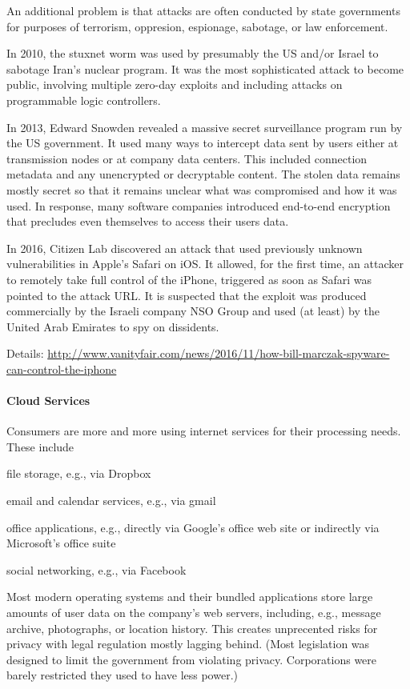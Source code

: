 An additional problem is that attacks are often conducted by state governments for purposes of terrorism, oppresion, espionage, sabotage, or law enforcement.

In 2010, the stuxnet worm was used by presumably the US and/or Israel to sabotage Iran's nuclear program.
It was the most sophisticated attack to become public, involving multiple zero-day exploits and including attacks on programmable logic controllers.

In 2013, Edward Snowden revealed a massive secret surveillance program run by the US government.
It used many ways to intercept data sent by users either at transmission nodes or at company data centers.
This included connection metadata and any unencrypted or decryptable content.
The stolen data remains mostly secret so that it remains unclear what was compromised and how it was used.
In response, many software companies introduced end-to-end encryption that precludes even themselves to access their users data.

In 2016, Citizen Lab discovered an attack that used previously unknown vulnerabilities in Apple's Safari on iOS.
It allowed, for the first time, an attacker to remotely take full control of the iPhone, triggered as soon as Safari was pointed to the attack URL.
It is suspected that the exploit was produced commercially by the Israeli company NSO Group and used (at least) by the United Arab Emirates to spy on dissidents.

Details: \url{http://www.vanityfair.com/news/2016/11/how-bill-marczak-spyware-can-control-the-iphone}

\paragraph{Cloud Services}
Consumers are more and more using internet services for their processing needs.
These include
\begin{compactitem}
\item file storage, e.g., via Dropbox
\item email and calendar services, e.g., via gmail
\item office applications, e.g., directly via Google's office web site or indirectly via Microsoft's office suite
\item social networking, e.g., via Facebook
\end{compactitem}
Most modern operating systems and their bundled applications store large amounts of user data on the company's web servers, including, e.g., message archive, photographs, or location history.
This creates unprecented risks for privacy with legal regulation mostly lagging behind.
(Most legislation was designed to limit the government from violating privacy.
Corporations were barely restricted they used to have less power.)

